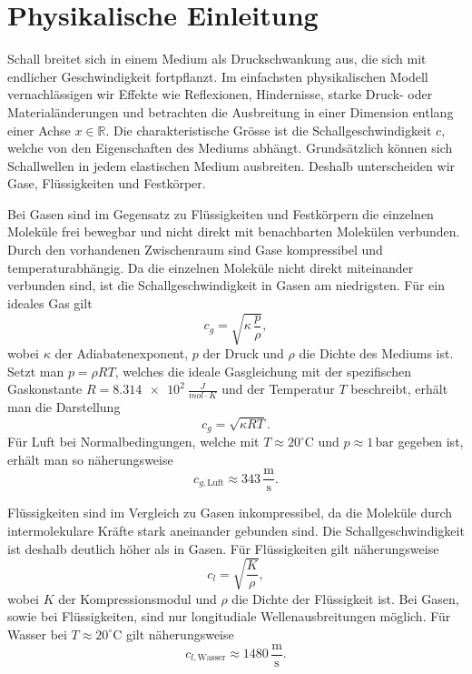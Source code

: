 %
%
%
%
\section{Physikalische Einleitung\label{schall:section:teil0}}

Schall breitet sich in einem Medium als Druckschwankung aus, die sich
mit endlicher Geschwindigkeit fortpflanzt.
Im einfachsten physikalischen Modell vernachlässigen wir Effekte wie
Reflexionen, Hindernisse, starke Druck- oder Materialänderungen und
betrachten die Ausbreitung in einer Dimension entlang einer Achse
$x \in \mathbb{R}$.
Die charakteristische Grösse ist die Schallgeschwindigkeit $c$, welche
von den Eigenschaften des Mediums abhängt.
Grundsätzlich können sich Schallwellen in jedem elastischen Medium ausbreiten.
Deshalb unterscheiden wir Gase, Flüssigkeiten und Festkörper.

Bei Gasen sind im Gegensatz zu Flüssigkeiten und Festkörpern die
einzelnen Moleküle frei bewegbar und nicht direkt mit
benachbarten Molekülen verbunden.
Durch den vorhandenen Zwischenraum sind Gase kompressibel und
temperaturabhängig.
Da die einzelnen Moleküle nicht direkt miteinander verbunden sind,
ist die Schallgeschwindigkeit in Gasen am niedrigsten.
Für ein ideales Gas gilt
\begin{equation}
    c_{g} = \sqrt{\kappa \, \frac{p}{\rho}},
\end{equation}
wobei $\kappa$ der Adiabatenexponent, $p$ der Druck und $\rho$ die
Dichte des Mediums ist.
Setzt man $p = \rho R T$, welches die ideale Gasgleichung mit der
spezifischen Gaskonstante $R = \SI{8.314e2}{\frac{J}{mol \cdot K}}$
und der Temperatur $T$ beschreibt, erhält man die Darstellung
\begin{equation}
    c_{g} = \sqrt{\kappa R T}.
    \label{eq:c-ideal-gas}
\end{equation}
Für Luft bei Normalbedingungen, welche mit
$T \approx 20^\circ \mathrm{C}$ und $p \approx 1\,\mathrm{bar}$
gegeben ist, erhält man so näherungsweise
\begin{equation}
    c_{g,\text{Luft}} \approx 343 \,\frac{\mathrm{m}}{\mathrm{s}}.
\end{equation}

Flüssigkeiten sind im Vergleich zu Gasen inkompressibel, da die
Moleküle durch intermolekulare Kräfte stark aneinander gebunden sind.
Die Schallgeschwindigkeit ist deshalb deutlich höher als in Gasen.
Für Flüssigkeiten gilt näherungsweise
\begin{equation}
    c_{l} = \sqrt{\frac{K}{\rho}},
    \label{eq:c-liquid}
\end{equation}
wobei $K$ der Kompressionsmodul und $\rho$ die Dichte der Flüssigkeit ist.
Bei Gasen, sowie bei Flüssigkeiten, sind nur longitudiale
Wellenausbreitungen möglich.
Für Wasser bei $T \approx 20^\circ \mathrm{C}$ gilt näherungsweise
\begin{equation}
    c_{l,\text{Wasser}} \approx 1480 \,\frac{\mathrm{m}}{\mathrm{s}}.
\end{equation}


